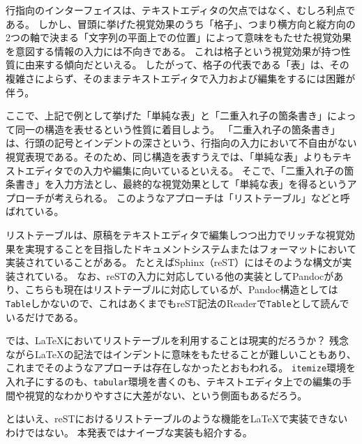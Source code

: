 \documentclass[uplatex,12pt,dvipdfmx]{jsarticle}
\begin{document}
行指向のインターフェイスは、テキストエディタの欠点ではなく、むしろ利点である。
しかし、冒頭に挙げた視覚効果のうち「格子」、つまり横方向と縦方向の2つの軸で決まる「文字列の平面上での位置」によって意味をもたせた視覚効果を意図する情報の入力には不向きである。
これは格子という視覚効果が持つ性質に由来する傾向だといえる。
したがって、格子の代表である「表」は、その複雑さによらず、そのままテキストエディタで入力および編集をするには困難が伴う。

ここで、上記で例として挙げた「単純な表」と「二重入れ子の箇条書き」によって同一の構造を表せるという性質に着目しよう。
「二重入れ子の箇条書き」は、行頭の記号とインデントの深さという、行指向の入力において不自由がない視覚表現である。そのため、同じ構造を表すうえでは、「単純な表」よりもテキストエディタでの入力や編集に向いているといえる。
そこで、「二重入れ子の箇条書き」を入力方法とし、最終的な視覚効果として「単純な表」を得るというアプローチが考えられる。
このようなアプローチは「\textsf{リストテーブル}」などと呼ばれている。

リストテーブルは、原稿をテキストエディタで編集しつつ出力でリッチな視覚効果を実現することを目指したドキュメントシステムまたはフォーマットにおいて実装されていることがある。
たとえばSphinx（reST）にはそのような構文が実装されている。
なお、reSTの入力に対応している他の実装としてPandocがあり、こちらも現在はリストテーブルに対応しているが、Pandoc構造としては\texttt{Table}しかないので、これはあくまでもreST記法のReaderで\texttt{Table}として読んでいるだけである。

では、\LaTeX においてリストテーブルを利用することは現実的だろうか？
残念ながら\LaTeX の記法ではインデントに意味をもたせることが難しいこともあり、これまでそのようなアプローチは存在しなかったとおもわれる。
\texttt{itemize}環境を入れ子にするのも、\texttt{tabular}環境を書くのも、テキストエディタ上での編集の手間や視覚的なわかりやすさに大差がない、という側面もあるだろう。

とはいえ、reSTにおけるリストテーブルのような機能を\LaTeX で実装できないわけではない。
本発表ではナイーブな実装も紹介する。
\end{document}

